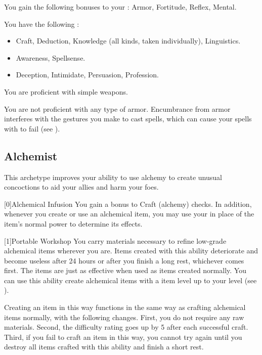         You gain the following bonuses to your :  Armor,  Fortitude,  Reflex,  Mental.

        You have the following :
        \begin{itemize}
            \item {} Craft, Deduction, Knowledge (all kinds, taken individually), Linguistics.
            \item {} Awareness, Spellsense.
            \item {} Deception, Intimidate, Persuasion, Profession.
        \end{itemize}

        You are proficient with simple weapons.

        You are not proficient with any type of armor.
        Encumbrance from armor interferes with the gestures you make to cast spells, which can cause your spells with  to fail (see ).

    \newpage
    \subsection{Alchemist}
        This archetype improves your ability to use alchemy to create unusual concoctions to aid your allies and harm your foes.

        [0]{Alchemical Infusion} You gain a  bonus to Craft (alchemy) checks.
        In addition, whenever you create or use an alchemical item, you may use your   in place of the item's normal power to determine its effects.

        [1]{Portable Workshop} 
        You carry materials necessary to refine low-grade alchemical items wherever you are.
        Items created with this ability deteriorate and become useless after 24 hours or after you finish a long rest, whichever comes first.
        The items are just as effective when used as items created normally.
        You can use this ability create alchemical items with a item level up to your level (see ).

        Creating an item in this way functions in the same way as crafting alchemical items normally, with the following changes.
        First, you do not require any raw materials.
        Second, the difficulty rating goes up by 5 after each successful craft.
        Third, if you fail to craft an item in this way, you cannot try again until you destroy all items crafted with this ability and finish a short rest.

